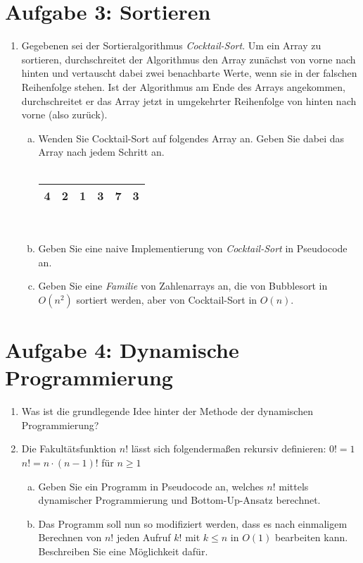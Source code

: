 \documentclass{scrartcl}
\begin{document}
\section*{Aufgabe 3: Sortieren}
\begin{enumerate}[(1)]
\item Gegebenen sei der Sortieralgorithmus \emph{Cocktail-Sort}. Um ein Array zu sortieren, durchschreitet der Algorithmus den Array zun\"achst von vorne nach hinten und vertauscht dabei zwei benachbarte Werte, wenn sie in der falschen Reihenfolge stehen. Ist der Algorithmus am Ende des Arrays angekommen, durchschreitet er das Array jetzt in umgekehrter Reihenfolge von hinten nach vorne (also \glqq zur\"uck\grqq).
\begin{enumerate}[(a)]
\item Wenden Sie Cocktail-Sort auf folgendes Array an. Geben Sie dabei das Array nach jedem Schritt an. \\
\\
\begin{center}
\begin{tabular}{|c|c|c|c|c|c|}
\hline
4 & 2 & 1 & 3 & 7 & 3 \\
\hline
\end{tabular}
\end{center}
\text{ } \\
\item Geben Sie eine naive Implementierung von \emph{Cocktail-Sort} in Pseudocode an.
\item Geben Sie eine \emph{Familie} von Zahlenarrays an, die von Bubblesort in $O(n^2)$ sortiert werden, aber von Cocktail-Sort in $O(n)$.
\end{enumerate}
\end{enumerate}

\section*{Aufgabe 4: Dynamische Programmierung}
\begin{enumerate}[(1)]

\item Was ist die grundlegende Idee hinter der Methode der dynamischen Programmierung?

\item Die Fakultätsfunktion $n!$ lässt sich folgendermaßen rekursiv definieren: \newline
$0! = 1$\newline
$n! = n\cdot(n-1)!$ 	für $n \geq 1$
\begin{enumerate}[(a)]
\item Geben Sie ein Programm in Pseudocode an, welches $n!$  mittels dynamischer Programmierung und Bottom-Up-Ansatz berechnet.
\item Das Programm soll nun so modifiziert werden, dass es nach einmaligem Berechnen von $n!$ jeden Aufruf $k!$ mit $k \leq n$ in $O(1)$ bearbeiten kann. Beschreiben Sie eine Möglichkeit dafür.
\end{enumerate}
\end{enumerate}
\end{document}
